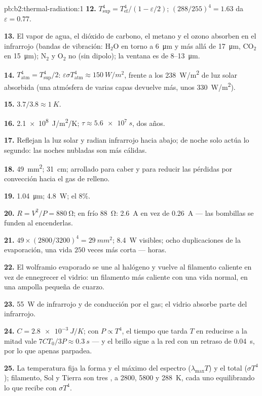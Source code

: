 \begin{solution}{pb:b2:thermal-radiation:1}
\textbf{12.} $T_{\text{sup}}^4 = T_{\text{ef}}^4/(1 - \varepsilon/2)$; $(288/255)^4 = 1.63$
da $\varepsilon = 0.77$.

\textbf{13.} El vapor de agua, el dióxido de carbono, el metano y el ozono absorben en el
infrarrojo (bandas de vibración: H$_2$O en torno a \qty{6}{\micro m} y más allá de
\qty{17}{\micro m}, CO$_2$ en \qty{15}{\micro m}); N$_2$ y O$_2$ no (sin
dipolo); la ventana es de \qty{8}{}--\qty{13}{\micro m}.

\textbf{14.} $T_{\text{atm}}^4 = T_{\text{sup}}^4/2$: $\varepsilon\sigma T_{\text{atm}}^4 \approx
\qty{150}{W/m^2}$, frente a los \qty{238}{W/m^2} de luz solar absorbida (una
atmósfera de varias capas devuelve más, unos \qty{330}{W/m^2}).

\textbf{15.} $3.7/3.8 \approx \qty{1}{K}$.

\textbf{16.} \qty{2.1e8}{J/m^2/K}; $\tau \approx \qty{5.6e7}{s}$, dos años.

\textbf{17.} Reflejan la luz solar y radian infrarrojo hacia abajo; de noche
solo actúa lo segundo: las noches nubladas son más cálidas.

\textbf{18.} \qty{49}{mm^2}; \qty{31}{cm}; arrollado para caber y para reducir
las pérdidas por convección hacia el gas de relleno.

\textbf{19.} \qty{1.04}{\micro m}; \qty{4.8}{W}; el $8\%$.

\textbf{20.} $R = V^2/P = \qty{880}{\ohm}$; en frío \qty{88}{\ohm}: \qty{2.6}{A}
en vez de \qty{0.26}{A} --- las bombillas se funden al encenderlas.

\textbf{21.} $49 \times (2800/3200)^4 = \qty{29}{mm^2}$; \qty{8.4}{W} visibles; ocho
duplicaciones de la evaporación, una vida $250$ veces más corta --- horas.

\textbf{22.} El wolframio evaporado se une al halógeno y vuelve
al filamento caliente en vez de ennegrecer el vidrio: un filamento más caliente
con una vida normal, en una ampolla pequeña de cuarzo.

\textbf{23.} \qty{55}{W} de infrarrojo y de conducción por el gas; el
vidrio absorbe parte del infrarrojo.

\textbf{24.} $C = \qty{2.8e-3}{J/K}$; con $P \propto T^4$, el tiempo que tarda $T$ en
reducirse a la mitad vale $7CT_0/3P \approx \qty{0.3}{s}$ --- y el brillo sigue a la red
con un retraso de \qty{0.04}{s}, por lo que apenas parpadea.

\textbf{25.} La temperatura fija la forma y el máximo del espectro
($\lambda_{\max}T$) y el total ($\sigma T^4$); filamento, Sol y Tierra
son tres , a \qty{2800}{}, \qty{5800}{} y \qty{288}{K}, cada uno
equilibrando lo que recibe con $\sigma T^4$.
\end{solution}
